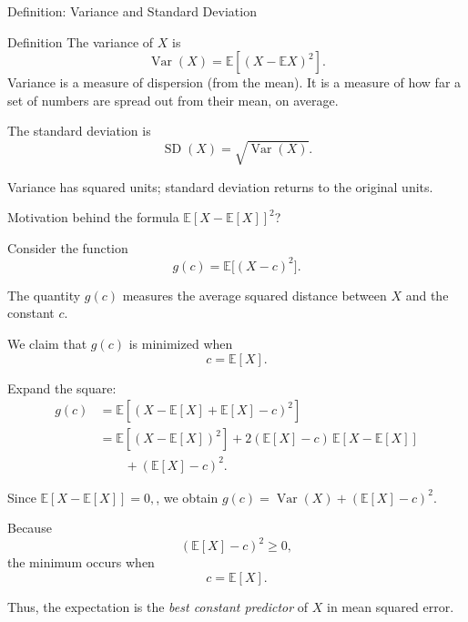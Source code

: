 \begin{frame}{Definition: Variance and Standard Deviation}
\begin{keybox}{Definition}
The variance of $X$ is
\[
\boxed{
\operatorname{Var}(X)
=
\mathbb{E}\left[(X-\mathbb{E}X)^2\right].
}
\]
Variance is a measure of dispersion (from the mean). It is a measure of how far a set of numbers are spread out from their mean, on average.
\end{keybox}

\vspace{0.25cm}

The standard deviation is
\[
\boxed{
\operatorname{SD}(X)=\sqrt{\operatorname{Var}(X)}.
}
\]

\vspace{0.25cm}

Variance has squared units; standard deviation returns to the original units.
\end{frame}


\begin{frame}{Motivation behind the formula \( \mathbb{E}[X-\mathbb{E}[X]]^2\)?}

Consider the function
\[
g(c)=\mathbb{E}\big[(X-c)^2\big].
\]

The quantity \(g(c)\) measures the average squared distance
between \(X\) and the constant \(c\).


We claim that \(g(c)\) is minimized when
\[
c=\mathbb{E}[X].
\]


Expand the square:
\[
\begin{aligned}
g(c)
&=
\mathbb{E}\left[(X-\mathbb{E}[X]+\mathbb{E}[X]-c)^2\right]
\\
&=
\mathbb{E}\left[(X-\mathbb{E}[X])^2\right]
+
2(\mathbb{E}[X]-c)\,
\mathbb{E}[X-\mathbb{E}[X]]
\\
&\qquad
+
(\mathbb{E}[X]-c)^2.
\end{aligned}
\]

Since $\mathbb{E}[X-\mathbb{E}[X]]=0,
$, we obtain $g(c)
=
\operatorname{Var}(X)
+
(\mathbb{E}[X]-c)^2.$

Because
\[
(\mathbb{E}[X]-c)^2\geq0,
\]
the minimum occurs when
\[
c=\mathbb{E}[X].
\]



Thus, the expectation is the \emph{best constant predictor}
of \(X\) in mean squared error.
\end{frame}








